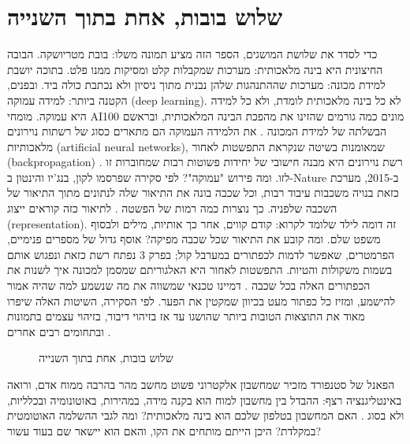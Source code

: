 \section{שלוש בובות, אחת בתוך השנייה}
כדי לסדר את שלושת המושגים, הספר הזה מציע תמונה משלו: בובת מטריושקה. הבובה החיצונית היא בינה מלאכותית: מערכות שמקבלות קלט ומסיקות ממנו פלט. בתוכה יושבת למידת מכונה: מערכות שההתנהגות שלהן נבנית מתוך ניסיון ולא נכתבת כולה ביד. ובפנים, הקטנה ביותר: למידה עמוקה (deep learning). לא כל בינה מלאכותית לומדת, ולא כל למידה היא עמוקה.
מומחי AI100 מונים כמה גורמים שהזינו את מהפכת הבינה המלאכותית, ובראשם הבשלתה של למידת המכונה \cite{S-ch01-08}. את הלמידה העמוקה הם מתארים כסוג של רשתות נוירונים מלאכותיות (artificial neural networks), שמאומנות בשיטה שנקראת התפשטות לאחור (backpropagation) \cite{S-ch01-08}. רשת נוירונים היא מבנה חישובי של יחידות פשוטות רבות שמחוברות זו לזו.
ומה פירוש "עמוקה"? לפי סקירה שפרסמו לקון, בנג'יו והינטון ב-Nature ב-2015, מערכת כזאת בנויה משכבות עיבוד רבות, וכל שכבה בונה את התיאור שלה לנתונים מתוך התיאור של השכבה שלפניה. כך נוצרות כמה רמות של הפשטה \cite{S-ch01-05}. לתיאור כזה קוראים ייצוג (representation). זה דומה לילד שלומד לקרוא: קודם קווים, אחר כך אותיות, מילים ולבסוף משפט שלם.
ומה קובע את התיאור שכל שכבה מפיקה? אוסף גדול של מספרים פנימיים, הפרמטרים, שאפשר לדמות לכפתורים במערבל קול; בפרק 3 נפתח רשת כזאת ונפגוש אותם בשמות משקולות והטיות. התפשטות לאחור היא האלגוריתם שמסמן למכונה איך לשנות את הכפתורים האלה בכל שכבה \cite{S-ch01-05}. דמיינו טכנאי שמשווה את מה שנשמע למה שהיה אמור להישמע, ומזיז כל כפתור מעט בכיוון שמקטין את הפער. לפי הסקירה, השיטות האלה שיפרו מאוד את התוצאות הטובות ביותר שהושגו עד אז בזיהוי דיבור, בזיהוי עצמים בתמונות ובתחומים רבים אחרים \cite{S-ch01-05}.
\begin{figure}[htbp]
\centering

\caption{שלוש בובות, אחת בתוך השנייה}\label{fig:1.1}
\end{figure}
\begin{thinkbox}
הפאנל של סטנפורד מזכיר שמחשבון אלקטרוני פשוט מחשב מהר בהרבה ממוח אדם, ורואה באינטליגנציה רצף: ההבדל בין מחשבון למוח הוא בקנה מידה, במהירות, באוטונומיה ובכלליות, ולא בסוג \cite{S-ch01-07}.
האם המחשבון בטלפון שלכם הוא בינה מלאכותית? ומה לגבי ההשלמה האוטומטית במקלדת? היכן הייתם מותחים את הקו, והאם הוא יישאר שם בעוד עשור?
\end{thinkbox}
